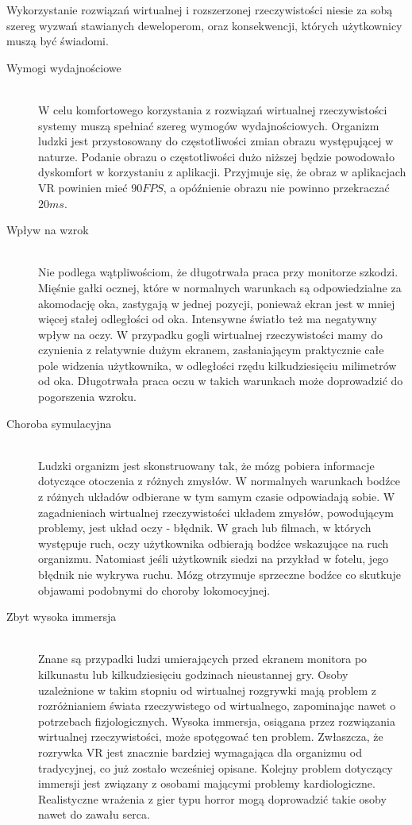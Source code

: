 \documentclass[a4paper,11pt,twoside]{report}
\theoremstyle{definition}
\begin{document}
Wykorzystanie rozwiązań wirtualnej i rozszerzonej rzeczywistości niesie za sobą szereg wyzwań stawianych deweloperom, oraz konsekwencji, których użytkownicy muszą być świadomi.

\pagebreak
\begin{description}
\item [Wymogi wydajnościowe] \hfill \\
W celu komfortowego korzystania z rozwiązań wirtualnej rzeczywistości systemy muszą spełniać szereg wymogów wydajnościowych. Organizm ludzki jest przystosowany do częstotliwości zmian obrazu występującej w naturze. Podanie obrazu o częstotliwości dużo niższej będzie powodowało dyskomfort w korzystaniu z aplikacji. Przyjmuje się, że obraz w aplikacjach VR powinien mieć $90 FPS$, a opóźnienie obrazu nie powinno przekraczać $20 ms$.
\item [Wpływ na wzrok] \hfill \\
Nie podlega wątpliwościom, że długotrwała praca przy monitorze szkodzi. Mięśnie gałki ocznej, które w normalnych warunkach są odpowiedzialne za akomodację oka, zastygają w jednej pozycji, ponieważ ekran jest w mniej więcej stałej odległości od oka. Intensywne światło też ma negatywny wpływ na oczy. W przypadku gogli wirtualnej rzeczywistości mamy do czynienia z relatywnie dużym ekranem, zasłaniającym praktycznie całe pole widzenia użytkownika, w odległości rzędu kilkudziesięciu milimetrów od oka. Długotrwała praca oczu w takich warunkach może doprowadzić do pogorszenia wzroku.
\item [Choroba symulacyjna] \hfill \\
Ludzki organizm jest skonstruowany tak, że mózg pobiera informacje dotyczące otoczenia z różnych zmysłów. W normalnych warunkach bodźce z różnych układów odbierane w tym samym czasie odpowiadają sobie. W zagadnieniach wirtualnej rzeczywistości układem zmysłów, powodującym problemy, jest układ oczy - błędnik. W grach lub filmach, w których występuje ruch, oczy użytkownika odbierają bodźce wskazujące na ruch organizmu. Natomiast jeśli użytkownik siedzi na przykład w fotelu, jego błędnik nie wykrywa ruchu. Mózg otrzymuje sprzeczne bodźce co skutkuje objawami podobnymi do choroby lokomocyjnej.
\item [Zbyt wysoka immersja] \hfill \\
Znane są przypadki ludzi umierających przed ekranem monitora po kilkunastu lub kilkudziesięciu godzinach nieustannej gry. Osoby uzależnione w takim stopniu od wirtualnej rozgrywki mają problem z rozróżnianiem świata rzeczywistego od wirtualnego, zapominając nawet o potrzebach fizjologicznych. Wysoka immersja, osiągana przez rozwiązania wirtualnej rzeczywistości, może spotęgować ten problem. Zwłaszcza, że rozrywka VR jest znacznie bardziej wymagająca dla organizmu od tradycyjnej, co już zostało wcześniej opisane. 
Kolejny problem dotyczący immersji jest związany z osobami mającymi problemy kardiologiczne. Realistyczne wrażenia z gier typu horror mogą doprowadzić takie osoby nawet do zawału serca.
\end{description}
\end{document}
